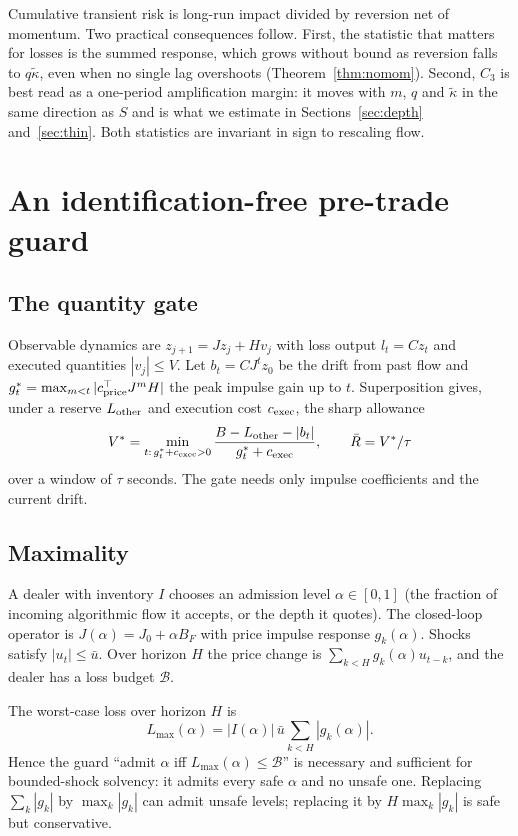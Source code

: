 Cumulative transient risk is long-run impact divided by reversion net of momentum. Two practical consequences follow. First, the statistic that matters for losses is the summed response, which grows without bound as reversion falls to $q\tilde\kappa$, even when no single lag overshoots (Theorem~\ref{thm:nomom}). Second, $C_3$ is best read as a one-period amplification margin: it moves with $m$, $q$ and $\tilde\kappa$ in the same direction as $S$ and is what we estimate in Sections~\ref{sec:depth} and~\ref{sec:thin}. Both statistics are invariant in sign to rescaling flow.

\section{An identification-free pre-trade guard}\label{sec:guard}

\subsection{The quantity gate}
Observable dynamics are $z_{j+1}=Jz_j+Hv_j$ with loss output $l_t=Cz_t$ and executed quantities $|v_j|\le V$. Let $b_t=CJ^tz_0$ be the drift from past flow and $g^*_t=\max_{m<t}|c^\top_{\rm price}J^mH|$ the peak impulse gain up to $t$. Superposition gives, under a reserve $L_{\rm other}$ and execution cost $c_{\rm exec}$, the sharp allowance
\begin{equation}\label{eq:gate}
V^*=\min_{t:\,g^*_t+c_{\rm exec}>0}\frac{B-L_{\rm other}-|b_t|}{g^*_t+c_{\rm exec}},\qquad\bar R=V^*/\tau
\end{equation}
over a window of $\tau$ seconds. The gate needs only impulse coefficients and the current drift.

\subsection{Maximality}
A dealer with inventory $I$ chooses an admission level $\alpha\in[0,1]$ (the fraction of incoming algorithmic flow it accepts, or the depth it quotes). The closed-loop operator is $J(\alpha)=J_0+\alpha B_F$ with price impulse response $g_k(\alpha)$. Shocks satisfy $|u_t|\le\bar u$. Over horizon $H$ the price change is $\sum_{k<H}g_k(\alpha)u_{t-k}$, and the dealer has a loss budget $\mathcal B$.

\begin{theorem}\label{thm:guard}
The worst-case loss over horizon $H$ is
\[
L_{\max}(\alpha)=|I(\alpha)|\,\bar u\sum_{k<H}|g_k(\alpha)|.
\]
Hence the guard ``admit $\alpha$ iff $L_{\max}(\alpha)\le\mathcal B$'' is necessary and sufficient for bounded-shock solvency: it admits every safe $\alpha$ and no unsafe one. Replacing $\sum_k|g_k|$ by $\max_k|g_k|$ can admit unsafe levels; replacing it by $H\max_k|g_k|$ is safe but conservative.
\end{theorem}

